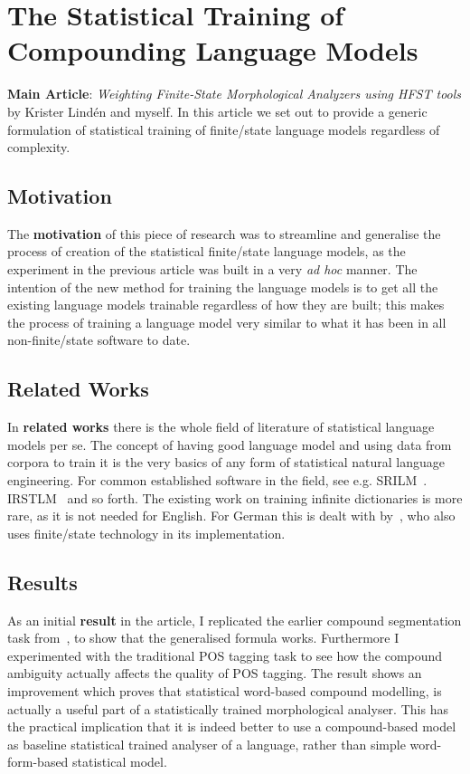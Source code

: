 \documentclass[officiallayout,final]{unihelcompling}
\begin{document}
\section{The Statistical Training of Compounding Language Models}
\label{sec:training-compounds}

\textbf{Main Article}: \emph{Weighting Finite-State Morphological Analyzers
using HFST tools} by Krister Lindén and myself. In this article we set out
to provide a generic formulation of statistical training of finite\-/state
language models regardless of complexity.

\subsection{Motivation}

The \textbf{motivation} of this piece of research was to streamline and generalise
the process of creation of the statistical finite\-/state language models, as the
experiment in the previous article  was built
in a very \emph{ad hoc} manner. The intention of the new method for training the
language models is to get all the existing language models trainable regardless
of how they are built; this makes the process of training a language model very
similar to what it has been in all non-finite\-/state software to date.

\subsection{Related Works}

In \textbf{related works} there is the whole field of literature of statistical
language models per se. The concept of having good language model and using
data from corpora to train it is the very basics of any form of statistical
natural language engineering. For common established software in the field, see
e.g.  SRILM~\citep{stolcke2002srilm}. IRSTLM~\citep{federico2008irstlm} and so
forth.  The existing work on training infinite dictionaries is more rare, as it
is not needed for English. For German this is dealt with
by~\citet{schiller2006german}, who also uses finite\-/state technology in its
implementation.

\subsection{Results}

As an initial \textbf{result} in the article, I replicated the earlier compound
segmentation task from~, to show that the generalised formula works.
Furthermore I experimented with the traditional POS tagging task to see how the
compound ambiguity actually affects the quality of POS tagging. The result
shows an improvement which proves that statistical word-based compound
modelling, is actually a useful part of a statistically trained morphological
analyser. This has the practical implication that it is indeed better to
use a compound-based model as baseline statistical trained analyser
of a language, rather than simple word-form-based statistical model.
\end{document}
